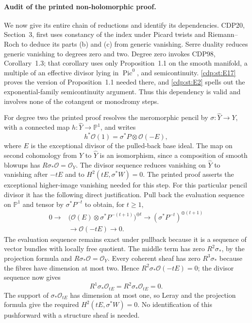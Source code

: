 \paragraph{Audit of the printed non-holomorphic proof.}
We now give its entire chain of reductions and identify its
dependencies. CDP20, Section~3, first uses constancy of the index
under Picard twists and Riemann--Roch to deduce its parts (b)
and (c) from generic vanishing. Serre duality reduces generic
vanishing to degrees zero and two. Degree zero invokes CDP98,
Corollary~1.3; that corollary uses only Proposition~1.1 on the
smooth manifold, a multiple of an effective divisor lying in
$\operatorname{Pic}^0$, and semicontinuity. \ref{cdp:st:E17} proves the
version of Proposition~1.1 needed there, and \ref{cdp:st:E2} spells out the
exponential-family semicontinuity argument. Thus this dependency
is valid and involves none of the cotangent or monodromy steps.

For degree two the printed proof resolves the meromorphic pencil
by $\sigma:\widehat Y\to Y$, with a connected map
$h:\widehat Y\to\mathbb P^1$, and writes
\[
 h^*\mathcal O(1)=\sigma^*P\otimes\mathcal O(-E),
\]
where $E$ is the exceptional divisor of the pulled-back base
ideal. The map on second cohomology from $Y$ to $\widehat Y$
is an isomorphism, since a composition of smooth blowups has
$R\sigma_*\mathcal O=\mathcal O_Y$. The divisor sequence
reduces vanishing on $\widehat Y$ to vanishing after $-tE$
and to $H^2(tE,\sigma^*W)=0$. The printed proof asserts
the exceptional higher-image vanishing needed for this step.
For this particular pencil divisor it has the following direct
justification. Pull back the evaluation sequence on $\mathbb P^1$
and tensor by $\sigma^*P^{-t}$ to obtain, for $t\geq1$,
\[
\begin{split}
0\longrightarrow&\bigl(\mathcal O(E)\otimes
              \sigma^*P^{-(t+1)}\bigr)^{\oplus t}
 \longrightarrow(\sigma^*P^{-t})^{\oplus(t+1)}\\
 &\longrightarrow\mathcal O(-tE)\longrightarrow0.
\end{split}
\]
The evaluation sequence remains exact under pullback because it
is a sequence of vector bundles with locally free quotient.
The middle term has zero $R^2\sigma_*$, by the projection
formula and $R\sigma_*\mathcal O=\mathcal O_Y$.
Every coherent sheaf has zero $R^3\sigma_*$ because the
fibres have dimension at most two. Hence
$R^2\sigma_*\mathcal O(-tE)=0$; the divisor sequence now gives
\[
 R^1\sigma_*\mathcal O_{tE}=
 R^2\sigma_*\mathcal O_{tE}=0.
\]
The support of $\sigma_*\mathcal O_{tE}$ has dimension at most
one, so Leray and the projection formula give the required
$H^2(tE,\sigma^*W)=0$. No identification of this pushforward
with a structure sheaf is needed.

